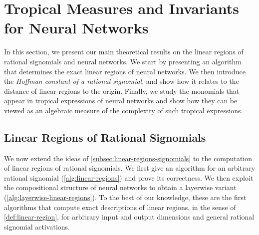 \documentclass[10pt]{article}
\theoremstyle{definition}
\theoremstyle{remark}
\begin{document}
\section{Tropical Measures and Invariants for Neural Networks} \label{sec:expressivity}

In this section, we present our main theoretical results on the linear regions of rational signomials and neural networks. We start by presenting an algorithm that determines the exact linear regions of neural networks. We then introduce the \emph{Hoffman constant of a rational signomial}, and show how it relates to the distance of linear regions to the origin.
Finally, we study the monomials that appear in tropical expressions of neural networks and show how they can be viewed as an algebraic measure of the complexity of such tropical expressions.

\subsection{Linear Regions of Rational Signomials} \label{subsection:rational-signomial-linear-regions}

We now extend the ideas of \cref{subsec:linear-regions-signomials} to the computation of linear regions of rational signomials. We first give an algorithm for an arbitrary rational signomial (\cref{alg:linear-regions}) and prove its correctness. We then exploit the compositional structure of neural networks to obtain a layerwise variant (\cref{alg:layerwise-linear-regions}). To the best of our knowledge, these are the first algorithms that compute exact descriptions of linear regions, in the sense of \cref{def:linear-region}, for arbitrary input and output dimensions and general rational signomial activations.
\end{document}

